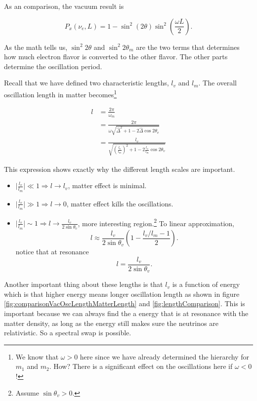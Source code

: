 \documentclass{tufte-handout}
\begin{document}
As an comparison, the vacuum result is

\begin{equation*}
P_x(\nu_e,L) = 1 - \sin^2(2\theta)\sin^2\left( \frac{\omega L}{2} \right) .
\end{equation*}

As the math tells us, $\sin^2 2\theta$ and $\sin^2 2\theta_m$ are the two terms that determines how much electron flavor is converted to the other flavor. The other parts determine the oscillation period.

Recall that we have defined two characteristic lengths, $l_v$ and $l_m$. The overall oscillation length in matter becomes\footnote{We know that $\omega>0$ here since we have already determined the hierarchy for $m_1$ and $m_2$. How? There is a significant effect on the oscillations here if $\omega<0$!}

\begin{align*}
l &= \frac{2\pi}{\omega_m} \\
& = \frac{2\pi}{\omega \sqrt{ \hat\Delta^2 + 1 - 2 \hat\Delta \cos 2\theta_v }} \\
& = \frac{l_v}{ \sqrt{\left(\frac{l_v}{l_m} \right)^2 +1 - 2\frac{l_v}{l_m}\cos 2\theta_v  }}
\end{align*}

This expression shows exactly why the different length scales are important.

\begin{itemize}
\item  $\lvert \frac{l_v}{l_m} \rvert \ll 1 \Rightarrow l\to l_v$, matter effect is minimal.
\item  $\lvert \frac{l_v}{l_m} \rvert \gg 1 \Rightarrow l\to 0 $, matter effect kills the oscillations.
\item  $\lvert \frac{l_v}{l_m}\rvert \sim 1 \Rightarrow l\to \frac{l_v}{2\sin\theta_v}$, more interesting region.\footnote{Assume $\sin\theta_v>0$.} To linear approximation, \begin{equation*}
l \approx \frac{l_v}{2\sin\theta_v} \left( 1 -  \frac{l_v/l_m - 1}{2} \right).
\end{equation*} notice that at resonance \begin{equation*}
l = \frac{l_v}{2\sin \theta_v}.
\end{equation*}
\end{itemize}


Another important thing about these lengths is that $l_v$ is a function of energy which is that higher energy means longer oscillation length as shown in figure \ref{fig:comparisonVacOscLengthMatterLength} and \ref{fig:lengthComparison}. This is important because we can always find the a energy that is at resonance with the matter density, as long as the energy still makes sure the neutrinos are relativistic. So a spectral swap is possible.
\end{document}

